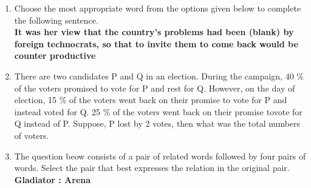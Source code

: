 \documentclass[journal,12pt,onecolumn]{IEEEtran}
\theoremstyle{remark}
\begin{document}
\begin{enumerate}
\begin{enumerate}
		\end{enumerate}
	\item Choose the most appropriate word from the options given below to complete the following sentence. \\
		\textbf{It was her view that the country's problems had been (blank) by foreign technocrats, so that to invite them to come back would be counter productive}
		\begin{enumerate}
		\end{enumerate}
	\item There are two candidates P and Q in an election. During the campaign, 40 \% of the voters promised to vote for P and rest for Q. However, on the day of election, 15 \% of the voters went back on their promise to vote for P and instead voted for Q. 25 \% of the voters went back on their promise tovote for Q instead of P. Suppose, P lost by 2 votes, then what was the total numbers of voters.
		\begin{enumerate}
				\begin{multicols}{4}
				\item 100
				\item 110
				\item 90
				\item 95
				\end{multicols}
		\end{enumerate}
	\item The question beow consists of a pair of related words followed by four pairs of words. Select the pair that best expresses the relation in the original pair. \\
		\textbf{Gladiator : Arena}
		\begin{enumerate}
				\begin{multicols}{2}

\end{multicols}
\end{enumerate}
\end{enumerate}
\end{document}
